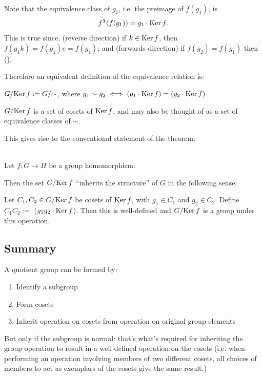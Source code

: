 \begin{remark*}~\\
  Note that the equivalence class of $g_1$, i.e. the preimage of $f(g_1)$, is
  \begin{align*}
    f^{\mathbf 1}(f(g_1)) = g_1\cdot\operatorname{\mathrm{Ker}} f.
  \end{align*}
  This is true since, (reverse direction) if $k \in \operatorname{\mathrm{Ker}} f$, then $f(g_1k) = f(g_1)e = f(g_1)$; and
  (forwards direction) if $f(g_2) = f(g_1)$ then ().

  Therefore an equivalent definition of the equivalence relation is:

  $G/{\operatorname{\mathrm{Ker}} f} := G/{\sim}$, where $g_1 \sim g_2 \iff (g_1\cdot \operatorname{\mathrm{Ker}} f) = (g_2\cdot \operatorname{\mathrm{Ker}} f)$.

  $G/{\operatorname{\mathrm{Ker}} f}$ is a set of cosets of $\operatorname{\mathrm{Ker}} f$, and may also be thought of as a set of equivalence
  classes of $\sim$.

  This gives rise to the conventional statement of the theorem:
\end{remark*}

\begin{theorem}~\\
  Let $f:G \to H$ be a group homomorphism.

  Then the set $G/{\operatorname{\mathrm{Ker}} f}$ ``inherits the structure'' of $G$ in the following sense:

  Let $C_1, C_2 \in G/{\operatorname{\mathrm{Ker}} f}$ be cosets of $\operatorname{\mathrm{Ker}} f$, with $g_1 \in C_1$ and $g_2 \in C_2$. Define
  $C_1C_2 := $ ($g_1g_2\cdot \operatorname{\mathrm{Ker}} f$). Then this is well-defined and $G/{\operatorname{\mathrm{Ker}} f}$ is a group under
  this operation.

\end{theorem}




\subsection{Summary}
A quotient group can be formed by:
\begin{enumerate}
\item Identify a subgroup
\item Form cosets
\item Inherit operation on cosets from operation on original group elements
\end{enumerate}
But only if the subgroup is normal: that's what's required for inheriting the group operation to
result in a well-defined operation on the cosets (i.e. when performing an operation involving
members of two different cosets, all choices of members to act as exemplars of the cosets give the
same result.)

